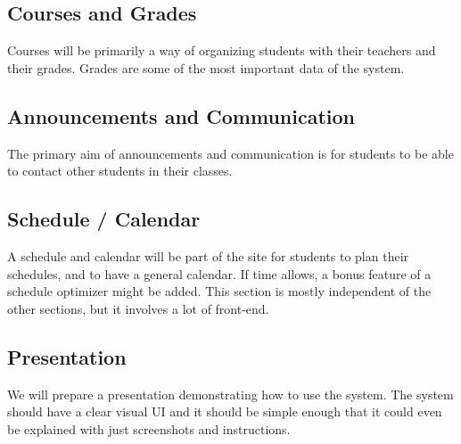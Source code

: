 \documentclass{article}
\begin{document}
\subsection{Courses and Grades}

Courses will be primarily a way of organizing students
with their teachers and their grades. Grades are some of the most important
data of the system.

\subsection{Announcements and Communication}

The primary aim of announcements and communication is for students to be able
to contact other students in their classes.

\subsection{Schedule / Calendar}

A schedule and calendar will be part of the site for students to plan their
schedules, and to have a general calendar. If time allows, a bonus feature of a
schedule optimizer might be added. This section is mostly independent of the
other sections, but it involves a lot of front-end.

\subsection{Presentation}

We will prepare a presentation demonstrating how to use the system. The system
should have a clear visual UI and it should be simple enough that it could even
be explained with just screenshots and instructions.

{} 
\end{document}
